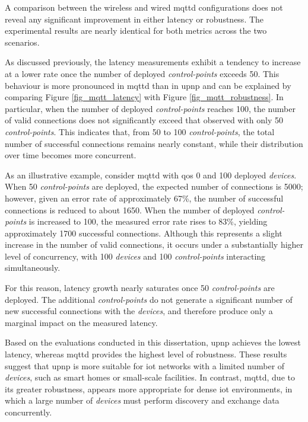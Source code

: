 \documentclass[lettersize,journal]{IEEEtran}
\begin{document}
A comparison between the wireless and wired \gls{mqttd} configurations does not reveal any significant improvement in either latency or robustness. The experimental results are nearly identical for both metrics across the two scenarios.

As discussed previously, the latency measurements exhibit a tendency to increase at a lower rate once the number of deployed \textit{control-points} exceeds 50. This behaviour is more pronounced in \gls{mqttd} than in \gls{upnp} and can be explained by comparing Figure \ref{fig_mqtt_latency} with Figure \ref{fig_mqtt_robustness}. In particular, when the number of deployed \textit{control-points} reaches 100, the number of valid connections does not significantly exceed that observed with only 50 \textit{control-points}. This indicates that, from 50 to 100 \textit{control-points}, the total number of successful connections remains nearly constant, while their distribution over time becomes more concurrent.

As an illustrative example, consider \gls{mqttd} with \gls{qos} 0 and 100 deployed \textit{devices}. When 50 \textit{control-points} are deployed, the expected number of connections is 5000; however, given an error rate of approximately 67\%, the number of successful connections is reduced to about 1650. When the number of deployed \textit{control-points} is increased to 100, the measured error rate rises to 83\%, yielding approximately 1700 successful connections. Although this represents a slight increase in the number of valid connections, it occurs under a substantially higher level of concurrency, with 100 \textit{devices} and 100 \textit{control-points} interacting simultaneously.

For this reason, latency growth nearly saturates once 50 \textit{control-points} are deployed. The additional \textit{control-points} do not generate a significant number of new successful connections with the \textit{devices}, and therefore produce only a marginal impact on the measured latency.

Based on the evaluations conducted in this dissertation, \gls{upnp} achieves the lowest latency, whereas \gls{mqttd} provides the highest level of robustness. These results suggest that \gls{upnp} is more suitable for \gls{iot} networks with a limited number of \textit{devices}, such as smart homes or small-scale facilities. In contrast, \gls{mqttd}, due to its greater robustness, appears more appropriate for dense \gls{iot} environments, in which a large number of \textit{devices} must perform discovery and exchange data concurrently.
\end{document}
